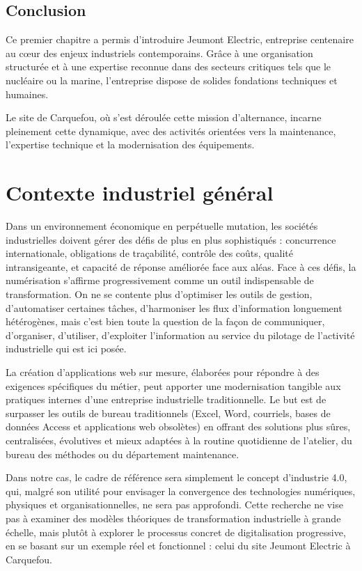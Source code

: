 \documentclass[11pt,a4paper]{article}
\begin{document}
\subsection{Conclusion}

Ce premier chapitre a permis d’introduire Jeumont Electric, entreprise centenaire au cœur des enjeux industriels contemporains. Grâce à une organisation structurée et à une expertise reconnue dans des secteurs critiques tels que le nucléaire ou la marine, l’entreprise dispose de solides fondations techniques et humaines.

Le site de Carquefou, où s’est déroulée cette mission d’alternance, incarne pleinement cette dynamique, avec des activités orientées vers la maintenance, l’expertise technique et la modernisation des équipements.



\newpage
\section{Contexte industriel général}

Dans un environnement économique en perpétuelle mutation, les sociétés industrielles doivent gérer des défis de plus en plus sophistiqués : concurrence internationale, obligations de traçabilité, contrôle des coûts, qualité intransigeante, et capacité de réponse améliorée face aux aléas. Face à ces défis, la numérisation s'affirme progressivement comme un outil indispensable de transformation. On ne se contente plus d’optimiser les outils de gestion, d’automatiser certaines tâches, d’harmoniser les flux d’information longuement hétérogènes, mais c’est bien toute la question de la façon de communiquer, d’organiser, d’utiliser, d’exploiter l’information au service du pilotage de l’activité industrielle qui est ici posée.


La création d'applications web sur mesure, élaborées pour répondre à des exigences spécifiques du métier, peut apporter une modernisation tangible aux pratiques internes d'une entreprise industrielle traditionnelle. Le but est de surpasser les outils de bureau traditionnels (Excel, Word, courriels, bases de données Access et applications web obsolètes) en offrant des solutions plus sûres, centralisées, évolutives et mieux adaptées à la routine quotidienne de l'atelier, du bureau des méthodes ou du département maintenance.

Dans notre cas, le cadre de référence sera simplement le concept d'industrie 4.0, qui, malgré son utilité pour envisager la convergence des technologies numériques, physiques et organisationnelles, ne sera pas approfondi. Cette recherche ne vise pas à examiner des modèles théoriques de transformation industrielle à grande échelle, mais plutôt à explorer le processus concret de digitalisation progressive, en se basant sur un exemple réel et fonctionnel : celui du site Jeumont Electric à Carquefou.
\end{document}
